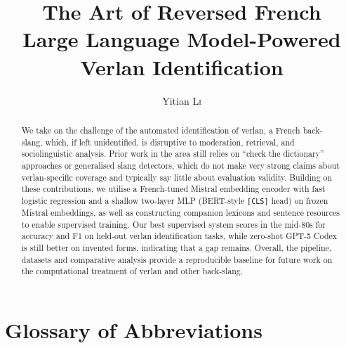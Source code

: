 \documentclass[12pt]{article}
\title{The Art of Reversed French\\\large Large Language Model-Powered Verlan Identification}
\author{Yitian \textsc{Li}}
\newcommand{\blankpage}{%
  \clearpage
  \thispagestyle{empty}
  \null
  \clearpage}
\newif\ifskipsectionclear
\begin{document}
\maketitle

\blankpage

\begin{abstract}
We take on the challenge of the automated identification of verlan, a French back-slang, which, if left unidentified, is disruptive to moderation, retrieval, and sociolinguistic analysis. Prior work in the area still relies on ``check the dictionary'' approaches or generalised slang detectors, which do not make very strong claims about verlan-specific coverage and typically say little about evaluation validity. Building on these contributions, we utilise a French-tuned Mistral embedding encoder with fast logistic regression and a shallow two-layer MLP (BERT-style \texttt{[CLS]} head) on frozen Mistral embeddings, as well as constructing companion lexicons and sentence resources to enable supervised training. Our best supervised system scores in the mid-80s for accuracy and F1 on held-out verlan identification tasks, while zero-shot GPT-5 Codex is still better on invented forms, indicating that a gap remains. Overall, the pipeline, datasets and comparative analysis provide a reproducible baseline for future work on the computational treatment of verlan and other back-slang.
\end{abstract}

\blankpage
\tableofcontents
\thispagestyle{empty}

\cleardoublepage
\skipsectioncleartrue
{}
\setcounter{page}{1}

\section*{Glossary of Abbreviations}
\end{document}
